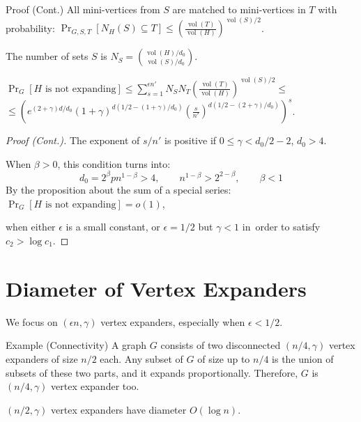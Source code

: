 \documentclass{beamer}
\DeclareMathOperator*{\vol}{vol}
\newcommand{\autotitle}{\secname\ifdefempty{\subsecname}{}{~--- \subsecname}}
\newcommand{\clearsubsecname}{\long\def\subsecname{}}
\newcommand{\smalldisplayskips}{
    \setlength{\abovedisplayskip}{3pt}
    \setlength{\belowdisplayskip}{3pt}}
\begin{document}
\begin{frame}{\autotitle}
    \smalldisplayskips
    \begin{block}{Proof (Cont.)}
        All mini-vertices from $S$ are matched to mini-vertices in $T$ with probability:
        $\Pr_{G,S,T}[N_H(S)\subseteq T]\leq\left(\frac{\vol(T)}{\vol(H)}\right)^{\vol(S)/2}$.

        The number of sets $S$ is $N_S=\binom{\vol(H)/d_0}{\vol(S)/d_0}$.

        $\Pr_G[H\text{ is not expanding}]
        \leq\sum_{s=1}^{\epsilon n'}{
            N_S
            N_T
            \left(\frac{\vol(T)}{\vol(H)}\right)^{\vol(S)/2}\leq
        }$
        $\leq\left(
            e^{(2+\gamma)d/d_0}
            (1+\gamma)^{d(1/2-(1+\gamma)/d_0)}
            \left(\frac{s}{n'}\right)^{d(1/2-(2+\gamma)/d_0)}
        \right)^s$.
    \end{block}
\end{frame}

\begin{frame}{\autotitle}
    \smalldisplayskips
    \begin{proof}[Proof (Cont.)]
        The exponent of $s/n'$ is positive if $0\leq\gamma<d_0/2-2$, $d_0>4$.
        
        When $\beta>0$, this condition turns into:
        \begin{equation*}
            d_0=2^\beta pn^{1-\beta}>4,
            \qquad n^{1-\beta}>2^{2-\beta},
            \qquad\beta<1
        \end{equation*}
        By the proposition about the sum of a special series:
        $\Pr_G[H\text{ is not expanding}]=o(1)$,
        
        when either $\epsilon$ is a small constant,
        or $\epsilon=1/2$ but $\gamma<1$ in~order to satisfy $c_2>\log c_1$.
    \end{proof}
\end{frame}

\section{Diameter of Vertex Expanders}
\clearsubsecname

\begin{frame}{\autotitle}
    We focus on $(\epsilon n,\gamma)$ vertex expanders,
    especially when $\epsilon<1/2$.
    \begin{block}{Example (Connectivity)}
        A graph $G$ consists of two disconnected $(n/4,\gamma)$
        vertex expanders of size $n/2$ each.
        Any subset of $G$ of size up to $n/4$ is the union of subsets
        of these two parts, and it expands proportionally.
        Therefore, $G$ is $(n/4,\gamma)$ vertex expander too.
    \end{block}
    \begin{theorem}
        $(n/2,\gamma)$ vertex expanders have diameter $O(\log n)$.
    \end{theorem}
\end{frame}
\end{document}
